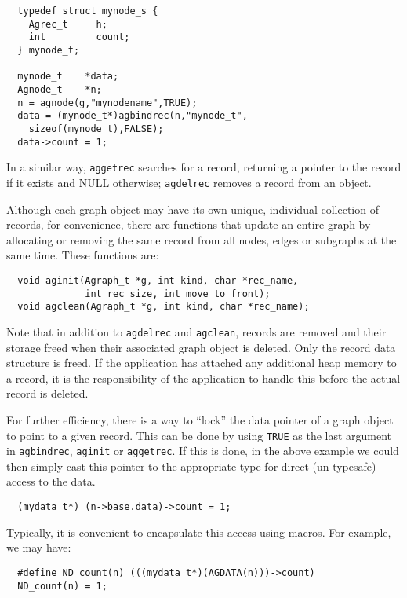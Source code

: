 \documentclass[11pt,letterpaper]{article}
\begin{document}
\begin{verbatim}
  typedef struct mynode_s {
    Agrec_t     h;
    int         count;
  } mynode_t;

  mynode_t    *data;
  Agnode_t    *n;
  n = agnode(g,"mynodename",TRUE);
  data = (mynode_t*)agbindrec(n,"mynode_t",
    sizeof(mynode_t),FALSE);
  data->count = 1;
\end{verbatim}

In a similar way, \verb"aggetrec" searches for a record, returning a pointer
to the record if it exists and NULL otherwise;
\verb"agdelrec" removes a record from an object. 

Although each graph object may have its own unique, individual collection
of records, for convenience, there are functions that update an entire graph
by allocating or removing the same record from all nodes,
edges or subgraphs at the same time.  These functions are:

\begin{verbatim}
  void aginit(Agraph_t *g, int kind, char *rec_name,
              int rec_size, int move_to_front);
  void agclean(Agraph_t *g, int kind, char *rec_name);
\end{verbatim}

Note that in addition to \verb"agdelrec" and \verb"agclean", records are removed
and their storage freed when their associated graph object is deleted. Only the
record data structure is freed. If the application has attached any additional heap
memory to a record, it is the responsibility of the application to handle this before
the actual record is deleted.

For further efficiency, there is a way to ``lock'' the data pointer of
a graph object to point to a given record.  This can be done by using \verb"TRUE"
as the last argument in \verb"agbindrec", \verb"aginit" or \verb"aggetrec".
If this is done, in the above example
we could then simply cast this pointer to the appropriate type
for direct (un-typesafe) access to the data.

\begin{verbatim}
  (mydata_t*) (n->base.data)->count = 1;
\end{verbatim}

Typically, it is convenient to encapsulate this access using macros. For example,
we may have:
\begin{verbatim}
  #define ND_count(n) (((mydata_t*)(AGDATA(n)))->count)
  ND_count(n) = 1;
\end{verbatim}
\end{document}
